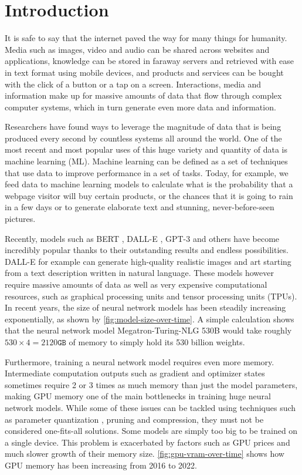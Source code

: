 
\chapter{Introduction}\label{chapter:introduction}

It is safe to say that the internet paved the way for many things for humanity.
Media such as images, video and audio can be shared across websites and applications, knowledge can be stored in faraway servers and retrieved with ease in text format using mobile devices, and products and services can be bought with the click of a button or a tap on a screen.
Interactions, media and information make up for massive amounts of data that flow through complex computer systems, which in turn generate even more data and information.

Researchers have found ways to leverage the magnitude of data that is being produced every second by countless systems all around the world.
One of the most recent and most popular uses of this huge variety and quantity of data is machine learning (ML).
Machine learning can be defined as a set of techniques that use data to improve performance in a set of tasks.
Today, for example, we feed data to machine learning models to calculate what is the probability that a webpage visitor will buy certain products, or the chances that it is going to rain in a few days or to generate elaborate text and stunning, never-before-seen pictures.

Recently, models such as BERT \cite{devlin2018bert}, DALL-E \cite{ramesh2021zero}, GPT-3 \cite{brown2020gpt3} and others have become incredibly popular thanks to their outstanding results and endless possibilities.
DALL-E for example can generate high-quality realistic images and art starting from a text description written in natural language.
These models however require massive amounts of data as well as very expensive computational resources, such as graphical processing units and tensor processing units (TPUs).
In recent years, the size of neural network models has been steadily increasing exponentially, as shown by \autoref{fig:model-size-over-time}.
A simple calculation shows that the neural network model Megatron-Turing-NLG 530B \cite{smith2022megatronturingnlg} would take roughly $530 \times 4 = 2120\texttt{GB}$ of memory to simply hold its 530 billion weights.

Furthermore, training a neural network model requires even more memory.
Intermediate computation outputs such as gradient and optimizer states sometimes require 2 or 3 times as much memory than just the model parameters, making GPU memory one of the main bottlenecks in training huge neural network models.
While some of these issues can be tackled using techniques such as parameter quantization \cite{DBLP:journals/corr/abs-2003-11316}, pruning and compression, they must not be considered one-fits-all solutions.
Some models are simply too big to be trained on a single device.
This problem is exacerbated by factors such as GPU prices and much slower growth of their memory size.
\autoref{fig:gpu-vram-over-time} shows how GPU memory has been increasing from 2016 to 2022.

